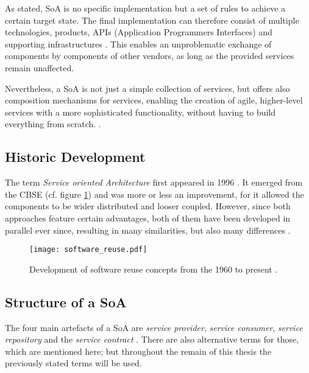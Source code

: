 As stated, SoA is no specific implementation but a set of rules to achieve a certain target state. The final implementation can therefore consist of multiple technologies, products, APIs (Application Programmers Interfaces) and supporting infrastructures \cite[p.29]{erl2011}. This enables an unproblematic exchange of components by components of other vendors, as long as the provided services remain unaffected.

Nevertheless, a SoA is not just a simple collection of services, but offers also composition mechanisms for services, enabling the creation of agile, higher-level services with a more sophisticated functionality, without having to build everything from scratch. \cite[p.12]{josuttis}.

\subsection{Historic Development}
The term \emph{Service oriented Architecture} first appeared in 1996 \cite[p.7]{rosen}. It emerged from the CBSE (cf. figure \ref{fig:software_reuse}) and was more or less an improvement, for it allowed the components to be wider distributed and looser coupled. However, since both approaches feature certain advantages, both of them have been developed in parallel ever since, resulting in many similarities, but also many differences \cite{breivold}. 


\begin{figure}[!htbp]
\centering
\texttt{[image: software\_reuse.pdf]}
\caption{Development of software reuse concepts from the 1960 to present \cite{clements}.}
\label{fig:software_reuse}
\end{figure}


\subsection{Structure of a SoA}
\label{sec:structure_of_soa}
The four main artefacts of a SoA are \emph{service provider}, \emph{service consumer}, \emph{service repository} and the \emph{service contract} \cite{arrowhead} \cite{breivold} \cite{rodrigues2011}. There are also alternative terms for those, which are mentioned here; but throughout the remain of this thesis the previously stated terms will be used.

